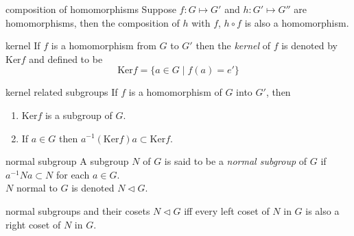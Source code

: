 \documentclass[avery5371,grid]{flashcards}
\begin{document}
\begin{flashcard}[Theorem]{composition of homomorphisms}
Suppose $f : G \mapsto G'$ and $h : G' \mapsto G''$ are homomorphisms,
then the composition of $h$ with $f$, $h\circ f$ is also a homomorphism.
\end{flashcard}

\begin{flashcard}[Definition]{kernel}
If $f$ is a homomorphism from $G$ to $G'$ then the \textit{kernel}
of $f$ is denoted by $\textrm{Ker}f$ and defined to be
\begin{equation*}
\textrm{Ker}f = \lbrace a \in G \mid f(a)=e' \rbrace
\end{equation*}
\end{flashcard}

\begin{flashcard}[Theorem]{kernel related subgroups}
If $f$ is a homomorphism of $G$ into $G'$, then
\begin{enumerate}
\item $\textrm{Ker} f$ is a subgroup of $G$.
\item If $a \in G$ then $a^{-1}(\textrm{Ker} f) a \subset \textrm{Ker} f$.
\end{enumerate}
\end{flashcard}

\begin{flashcard}[Definition]{normal subgroup}
A subgroup $N$ of $G$ is said to be a \textit{normal subgroup}
of $G$ if $a^{-1}Na \subset N$ for each $a \in G$.
\medskip
\\
$N$ normal to $G$ is denoted $N \lhd G$.
\end{flashcard}

\begin{flashcard}[Theorem]{normal subgroups and their cosets}
$N \lhd G$ iff every left coset of $N$ in $G$ is also a right
coset of $N$ in $G$.
\end{flashcard}
\end{document}
